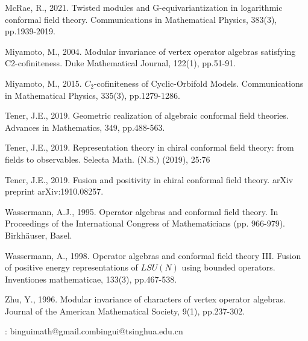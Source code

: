 \documentclass[11pt,b5paper,notitlepage]{article}
\theoremstyle{definition}
\theoremstyle{plain}
\numberwithin{equation}{subsection}
\begin{document}
\begin{thebibliography}{999999}
McRae, R., 2021. Twisted modules and G-equivariantization in logarithmic conformal field theory. Communications in Mathematical Physics, 383(3), pp.1939-2019.

Miyamoto, M., 2004. Modular invariance of vertex operator algebras satisfying C2-cofiniteness. Duke Mathematical Journal, 122(1), pp.51-91.

Miyamoto, M., 2015. $C_2$-cofiniteness of Cyclic-Orbifold Models. Communications in Mathematical Physics, 335(3), pp.1279-1286.



Tener, J.E., 2019. Geometric realization of algebraic conformal field theories. Advances in Mathematics, 349, pp.488-563.


Tener, J.E., 2019. Representation theory in chiral conformal field theory: from fields to
observables. Selecta Math. (N.S.) (2019), 25:76

Tener, J.E., 2019. Fusion and positivity in chiral conformal field theory. arXiv preprint arXiv:1910.08257.


Wassermann, A.J., 1995. Operator algebras and conformal field theory. In Proceedings of the International Congress of Mathematicians (pp. 966-979). Birkhäuser, Basel.


Wassermann, A., 1998. Operator algebras and conformal field theory III. Fusion of positive energy representations of $LSU(N)$ using bounded operators. Inventiones mathematicae, 133(3), pp.467-538.


Zhu, Y., 1996. Modular invariance of characters of vertex operator algebras. Journal of the American Mathematical Society, 9(1), pp.237-302.	
		
		
\end{thebibliography}


: binguimath@gmail.com\qquad bingui@tsinghua.edu.cn
\end{document}
